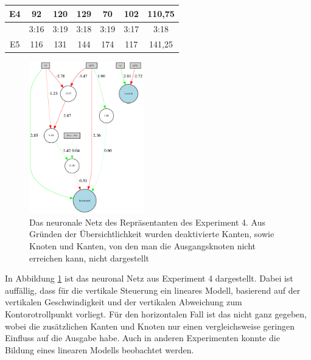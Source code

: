 \documentclass[11pt,final,journal,a4paper,towside,towcolumn]{IEEEtran}
\begin{document}
\begin{table}
\begin{tabular}{|c|c|c|c|c|c|c|}
		\multirow{-2}{*}{E4} & \cellcolor[HTML]{9AFF99}92                          & \cellcolor[HTML]{9AFF99}120  & \cellcolor[HTML]{9AFF99}129  & \cellcolor[HTML]{C0C0C0}70   & \cellcolor[HTML]{9AFF99}102  & \cellcolor[HTML]{9AFF99}110,75  \\ \hline
		& \cellcolor[HTML]{9AFF99}3:16                        & \cellcolor[HTML]{9AFF99}3:19 & \cellcolor[HTML]{9AFF99}3:18 & \cellcolor[HTML]{FFCCC9}3:19 & \cellcolor[HTML]{C0C0C0}3:17 & \cellcolor[HTML]{C0C0C0}3:18    \\ \cline{2-7} 
		\multirow{-2}{*}{E5} & \cellcolor[HTML]{9AFF99}116                         & \cellcolor[HTML]{9AFF99}131  & \cellcolor[HTML]{9AFF99}144  & \cellcolor[HTML]{FFCCC9}174  & \cellcolor[HTML]{C0C0C0}117  & \cellcolor[HTML]{C0C0C0}141,25  \\ \hline 
	\end{tabular}
\end{table}

\begin{figure}
	\centering
	\includegraphics[height=250px]{winner_e4_clean.png}
	\caption{Das neuronale Netz des Repräsentanten des Experiment 4. Aus Gründen der Übersichtlichkeit wurden deaktivierte Kanten, sowie Knoten und Kanten, von den man die Ausgangsknoten nicht erreichen kann, nicht dargestellt}
	\label{fig:netz}
\end{figure}

In Abbildung \ref{fig:netz} ist das neuronal Netz aus Experiment 4 dargestellt. Dabei ist auffällig, dass für die vertikale Steuerung ein lineares Modell, basierend auf der vertikalen Geschwindigkeit und der vertikalen Abweichung zum Kontorotrollpunkt vorliegt. Für den horizontalen Fall ist das nicht ganz gegeben, wobei die zusätzlichen Kanten und Knoten nur einen vergleichsweise geringen Einfluss auf die Ausgabe habe. Auch in anderen Experimenten konnte die Bildung eines linearen Modells beobachtet werden.
\end{document}
